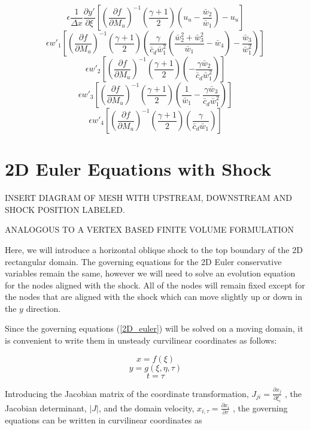 \documentclass[10pt]{article}
\begin{document}
	$$
		\epsilon \frac{1}{\Delta x} \frac{\partial y'}{\partial \xi} \left[ \left( \frac{\partial f}{\partial M_u} \right)^{-1} \left( \frac{\gamma + 1}{2} \right) \left( u_u - \frac{\bar{w}_2}{\bar{w}_1} \right) - u_u \right]
	$$
	$$
		\epsilon w'_1 \left[ \left( \frac{\partial f}{\partial M_u} \right)^{-1} \left( \frac{\gamma + 1}{2} \right) \left( \frac{\gamma}{\bar{c}_d \bar{w}_1^2} \left( \frac{\bar{w}_2^2 + \bar{w}_3^2}{\bar{w}_1} - \bar{w}_4 \right) - \frac{\bar{w}_3}{\bar{w}_1^2} \right) \right]
	$$
	$$
		\epsilon w'_2 \left[ \left( \frac{\partial f}{\partial M_u} \right)^{-1} \left( \frac{\gamma + 1}{2} \right) \left( -\frac{\gamma \bar{w}_2}{\bar{c}_d \bar{w}_1^2}  \right) \right]
	$$
	$$
		\epsilon w'_3 \left[ \left( \frac{\partial f}{\partial M_u} \right)^{-1} \left( \frac{\gamma + 1}{2} \right) \left(\frac{1}{\bar{w}_1} -  \frac{\gamma \bar{w}_3}{\bar{c}_d \bar{w}_1^2} \right) \right]
	$$
	$$
		\epsilon w'_4 \left[ \left( \frac{\partial f}{\partial M_u} \right)^{-1} \left( \frac{\gamma + 1}{2} \right) \left( \frac{\gamma}{\bar{c}_d \bar{w}_1}  \right) \right]
	$$
	
	
	 
	
	\section{2D Euler Equations with Shock}
	
	INSERT DIAGRAM OF MESH WITH UPSTREAM, DOWNSTREAM AND SHOCK POSITION LABELED.
	
	ANALOGOUS TO A VERTEX BASED FINITE VOLUME FORMULATION
	
	Here, we will introduce a horizontal oblique shock to the top boundary of the 2D rectangular domain. The governing equations for the 2D Euler conservative variables remain the same, however we will need to solve an evolution equation for the nodes aligned with the shock. All of the nodes will remain fixed except for the nodes that are aligned with the shock which can move slightly up or down in the $y$ direction.
	
	Since the governing equations (\ref{2D_euler}) will be solved on a moving domain, it is convenient to write them in unsteady curvilinear coordinates as follows:
	
	$$ x = f(\xi) $$
	$$ y = g(\xi,\eta,\tau) $$
	$$ t = \tau $$
	
	Introducing the Jacobian matrix of the coordinate transformation, $J_{ji} = \frac{\partial x_j}{\partial \xi_i}$ , the Jacobian determinant, $|J|$, and the domain velocity, $x_{i,\tau} = \frac{\partial x_i}{\partial \tau}$ , the governing equations can be written in curvilinear coordinates as
	
\end{document}

